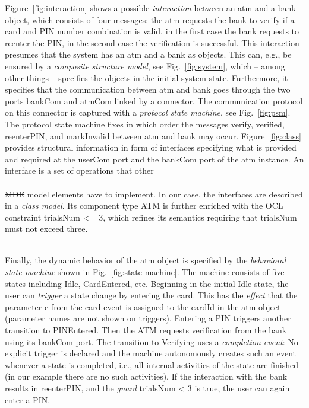 \documentclass[10pt, a4paper]{isov2}
\newcommand{\bc}[1]{~\\{\color{violet}\large \hrulefill \href{http://issues.omg.org/browse/DOL-#1}{\normalfont{JIRA DOL-{}#1}} \hrulefill\\}  }
\newcommand{\ec}[0]{~\\{{\color{violet}\large \hrulefill {\normalfont{end}} \hrulefill\\}  }}
\renewcommand{\figurerefname}{Figure}
\renewcommand{\fref}[1]{\figurerefname~\ref{#1}}
\newcommand{\uml}[1]{\textsf{#1}}
\providecommand{\DIFdeltex}[1]{{\protect\color{red}\sout{#1}}}                      %
\providecommand{\DIFdelbegin}{} %
\providecommand{\DIFdelend}{} %
\providecommand{\DIFdel}[1]{\texorpdfstring{\DIFdeltex{#1}}{}} %
\begin{document}
\fref{fig:interaction} shows a possible \emph{interaction} between
an \uml{atm} and a \uml{bank} object, which consists of four messages:
the \uml{atm} requests the \uml{bank} to \uml{verify} if a card and PIN
number combination is valid, in the first case the \uml{bank} requests
to reenter the PIN, in the second case the verification is successful.
This interaction presumes that the system has an \uml{atm} and a
\uml{bank} as objects. This can, e.g., be ensured by a \emph{composite
  structure model}, see Fig.~\ref{fig:system}, which -- among other
things -- specifies the objects in the initial system state.
Furthermore, it specifies that the communication between \uml{atm} and
\uml{bank} goes through the two ports \uml{bankCom} and \uml{atmCom}
linked by a connector.  The communication protocol on this connector is
captured with a \emph{protocol state machine}, see Fig.~\ref{fig:psm}.
The protocol state machine fixes in which order the messages
\uml{verify}, \uml{verified}, \uml{reenterPIN}, and \uml{markInvalid}
between \uml{atm} and \uml{bank} may occur.  Figure~\ref{fig:class}
provides structural information in form of interfaces specifying what is
provided and required at the \uml{userCom} port and the \uml{bankCom}
port of the \uml{atm} instance.  An interface is a set of operations
that other
\bc{82}
\DIFdelbegin \DIFdel{MDE }\DIFdelend model elements have to implement. In our case, the
interfaces are described in a \emph{class model}. Its component type 
\uml{ATM} is further enriched with the OCL
constraint \uml{trialsNum <= 3}, which refines its semantics requiring
that \uml{trialsNum} must not exceed three.
\ec

Finally, the dynamic behavior of the \uml{atm} object is specified by
the \emph{behavioral state machine} shown in
Fig.~\ref{fig:state-machine}. The machine consists of five states
including \uml{Idle}, \uml{CardEntered}, etc.  Beginning in the
initial \uml{Idle} state, the user can \emph{trigger} a state change
by entering the \uml{card}. This has the \emph{effect} that the
parameter \uml{c} from the \uml{card} event is assigned to the
\uml{cardId} in the \uml{atm} object (parameter names are not shown on
triggers). Entering a \uml{PIN} triggers another transition to
\uml{PINEntered}.  Then the ATM requests verification from the bank
using its \uml{bankCom} port.  The transition to \uml{Verifying} uses
a \emph{completion event}: No explicit trigger is declared and the
machine autonomously creates such an event whenever a state is
completed, i.e., all internal activities of the state are finished (in
our example there are no such activities).  If the interaction with
the bank results in \uml{reenterPIN}, and the \emph{guard}
\uml{trialsNum < 3} is true, the user can again enter a \uml{PIN}.
\end{document}
